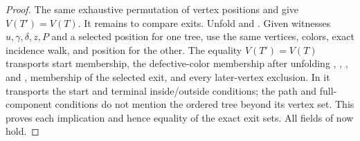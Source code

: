 \begin{proof}
The same exhaustive permutation of vertex positions and
 give $V(T')=V(T)$.  It remains to compare
exits.  Unfold  and
.  Given witnesses
$u,\gamma,\delta,z,P$ and a selected position for one tree, use the same
vertices, colors, exact incidence walk, and position for the other.
The equality $V(T')=V(T)$ transports start membership, the defective-color
membership after unfolding ,
, , and
, membership of the selected exit, and every
later-vertex exclusion.  In  it transports the start
and terminal inside/outside conditions; the path and full-component
conditions do not mention the ordered tree beyond its vertex set.  This
proves each implication and hence equality of the exact exit sets.  All
fields of  now hold.
\end{proof}
